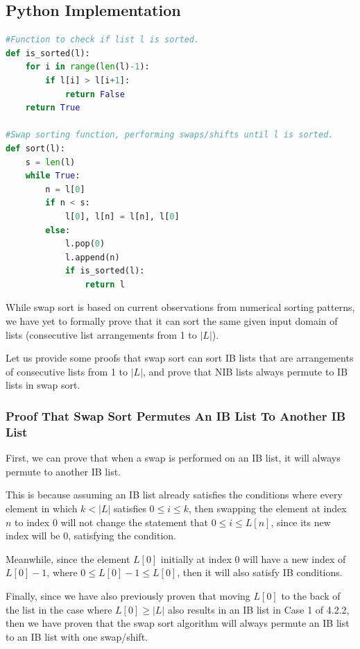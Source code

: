 \documentclass[12pt]{article}
\begin{document}
\subsection*{Python Implementation}
\begin{lstlisting}[language=Python]
#Function to check if list l is sorted.
def is_sorted(l):
    for i in range(len(l)-1):
        if l[i] > l[i+1]:
            return False
    return True

#Swap sorting function, performing swaps/shifts until l is sorted.
def sort(l):
    s = len(l)
    while True:
        n = l[0]
        if n < s:
            l[0], l[n] = l[n], l[0]
        else:
            l.pop(0)
            l.append(n)
            if is_sorted(l):
                return l
\end{lstlisting}

While swap sort is based on current observations from numerical sorting patterns, we have yet to formally prove that it can sort the same given input domain of lists (consecutive list arrangements from 1 to $|L|$).

Let us provide some proofs that swap sort can sort IB lists that are arrangements of consecutive lists from 1 to $|L|$, and prove that NIB lists always permute to IB lists in swap sort.

\subsubsection{Proof That Swap Sort Permutes An IB List To Another IB List}
First, we can prove that when a swap is performed on an IB list, it will always permute to another IB list.

This is because assuming an IB list already satisfies the conditions where every element in which $k < |L|$ satisfies $0 \leq i \leq k$, then swapping the element at index $n$ to index 0 will not change the statement that $0 \leq i \leq L[n]$, since its new index will be 0, satisfying the condition.

Meanwhile, since the element $L[0]$ initially at index 0 will have a new index of $L[0]-1$, where $0 \leq L[0]-1 \leq L[0]$, then it will also satisfy IB conditions.

Finally, since we have also previously proven that moving $L[0]$ to the back of the list in the case where $L[0] \geq |L|$ also results in an IB list in Case 1 of 4.2.2, then we have proven that the swap sort algorithm will always permute an IB list to an IB list with one swap/shift.
\end{document}
